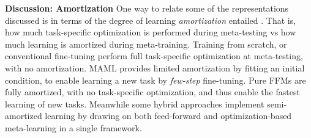 \documentclass[10pt,journal,compsoc]{IEEEtran}
\newcommand{\keypoint}[1]{\vspace{0.1cm}\noindent\textbf{#1}\quad}
\begin{document}
\keypoint{Discussion: Amortization} One way to relate some of the representations discussed is in terms of the degree of learning \emph{amortization} entailed \cite{gordon2018metaprobainference}. That is, how much task-specific optimization is performed during meta-testing vs  how much learning is amortized during meta-training. Training from scratch, or conventional fine-tuning \cite{yosinski2014howtransferable} perform full task-specific optimization at meta-testing, with no amortization. MAML \cite{finn2017maml} provides limited amortization by fitting an initial condition, to enable learning a new task by \emph{few-step} fine-tuning. Pure FFMs 
\cite{snell2017prototypicalnets,vinyals2016matching,requeima2019cnap} are fully amortized, with no task-specific optimization, and thus enable the fastest learning of new tasks. Meanwhile some hybrid approaches \cite{rusu2019leo,antoniou2019learning,triantafillou2019metadataset,lee2020balance} implement semi-amortized learning by drawing on both feed-forward and optimization-based meta-learning in a single framework.
\end{document}
